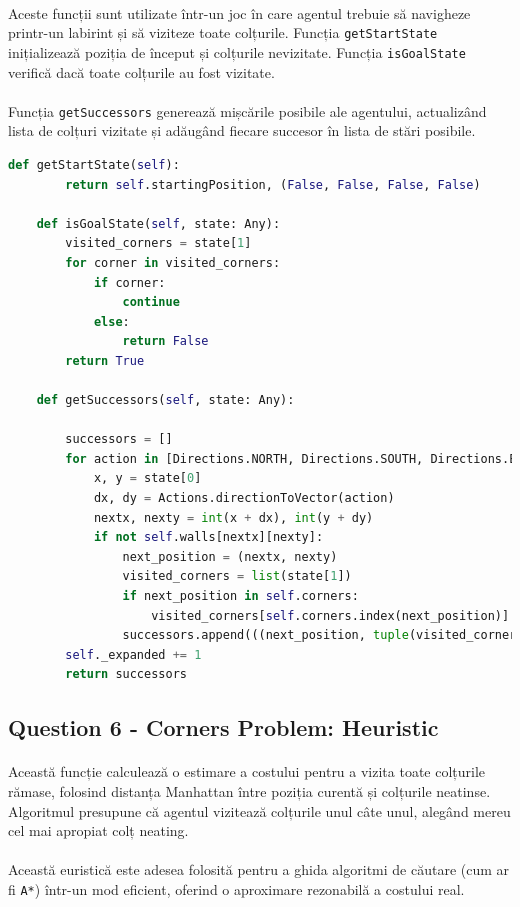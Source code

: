 \documentclass[12pt]{article}
\begin{document}
\paragraph{}Aceste funcții sunt utilizate într-un joc în care agentul trebuie să navigheze printr-un labirint și să viziteze toate colțurile. Funcția \texttt{getStartState} inițializează poziția de început și colțurile nevizitate. Funcția \texttt{isGoalState} verifică dacă toate colțurile au fost vizitate. \paragraph{}Funcția \texttt{getSuccessors} generează mișcările posibile ale agentului, actualizând lista de colțuri vizitate și adăugând fiecare succesor în lista de stări posibile.
\begin{lstlisting}[language=Python]
    def getStartState(self):
        return self.startingPosition, (False, False, False, False)

    def isGoalState(self, state: Any):  
        visited_corners = state[1]
        for corner in visited_corners:
            if corner:
                continue
            else:
                return False
        return True

    def getSuccessors(self, state: Any):

        successors = []
        for action in [Directions.NORTH, Directions.SOUTH, Directions.EAST, Directions.WEST]:
            x, y = state[0]
            dx, dy = Actions.directionToVector(action)
            nextx, nexty = int(x + dx), int(y + dy)
            if not self.walls[nextx][nexty]:
                next_position = (nextx, nexty)
                visited_corners = list(state[1])
                if next_position in self.corners:
                    visited_corners[self.corners.index(next_position)] = True
                successors.append(((next_position, tuple(visited_corners)), action, 1))
        self._expanded += 1
        return successors
\end{lstlisting}

	\subsection{Question 6 - Corners Problem: Heuristic}
\paragraph{}Această funcție calculează o estimare a costului pentru a vizita toate colțurile rămase, folosind distanța Manhattan între poziția curentă și colțurile neatinse. Algoritmul presupune că agentul vizitează colțurile unul câte unul, alegând mereu cel mai apropiat colț neating. \paragraph{}Această euristică este adesea folosită pentru a ghida algoritmi de căutare (cum ar fi \texttt{A*}) într-un mod eficient, oferind o aproximare rezonabilă a costului real.
\end{document}

